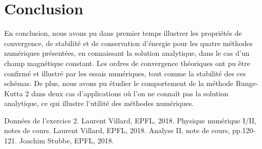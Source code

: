 \documentclass[a4paper,12pt,oneside]{article}
\begin{document}
\newpage
\section{Conclusion}
En conclusion, nous avons pu dans premier temps illustrer les propriétés de convergence, de stabilité et de conservation d'énergie pour les quatre méthodes numériques présentées, en connaissant la solution analytique, dans le cas d'un champ magnétique constant. Les ordres de convergence théoriques ont pu être confirmé et illustré par les essais numériques, tout comme la stabilité des ces schémas.
De plus, nous avons pu étudier le comportement de la méthode Runge-Kutta 2 dans deux cas d'applications où l'on ne connaît pas la solution analytique, ce qui illustre l'utilité des méthodes numériques.


\begin{thebibliography}{99}
Données de l'exercice 2. Laurent Villard, EPFL, 2018.
Physique numérique I/II, notes de cours. Laurent Villard, EPFL, 2018.
Analyse II, note de cours, pp.120-121. Joachim Stubbe, EPFL, 2018.
 \end{thebibliography}
\end{document}
